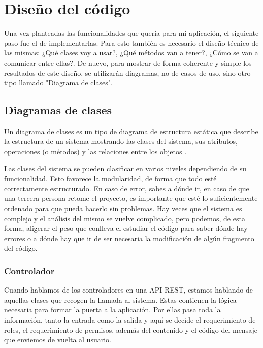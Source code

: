 \section {Diseño del código}

Una vez planteadas las funcionalidades que quería para mi aplicación, el siguiente paso fue el de implementarlas. Para esto también es necesario el diseño técnico de las mismas: ¿Qué clases voy a usar?, ¿Qué métodos van a tener?, ¿Cómo se van a comunicar entre ellas?. De nuevo, para mostrar de forma coherente y simple los resultados de este diseño, se utilizarán diagramas, no de casos de uso, sino otro tipo llamado "Diagrama de clases".

\subsection {Diagramas de clases}

Un diagrama de clases es un tipo de diagrama de estructura estática que describe la estructura de un sistema mostrando las clases del sistema, sus atributos, operaciones (o métodos) y las relaciones entre los objetos \cite{wiki_diagrama_clases}.

Las clases del sistema se pueden clasificar en varios niveles dependiendo de su funcionalidad. Esto favorece la modularidad, de forma que todo esté correctamente estructurado. En caso de error, sabes a dónde ir, en caso de que una tercera persona retome el proyecto, es importante que esté lo suficientemente ordenado para que pueda hacerlo sin problemas. Hay veces que el sistema es complejo y el análisis del mismo se vuelve complicado, pero podemos, de esta forma, aligerar el peso que conlleva el estudiar el código para saber dónde hay errores o a dónde hay que ir de ser necesaria la modificación de algún fragmento del código.

\subsubsection {Controlador}

Cuando hablamos de los controladores en una API REST, estamos hablando de aquellas clases que recogen la llamada al sistema. Estas contienen la lógica necesaria para formar la puerta a la aplicación. Por ellas pasa toda la información, tanto la entrada como la salida y aquí se decide el requerimiento de roles, el requerimiento de permisos, además del contenido y el código del mensaje que enviemos de vuelta al usuario.

